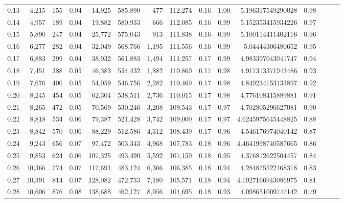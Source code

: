 \begin{tabular}{rrrrrrrrrrrrrrr}
0.13 &   4,215 &    155 &  0.04 &   14,925 &  585,890 &      477 &  112,274 &  0.16 &  1.00 &      5.196317549290028 &      0.98 \\
0.14 &   4,957 &    189 &  0.04 &   19,882 &  580,933 &      666 &  112,085 &  0.16 &  0.99 &      5.152353415934226 &      0.97 \\
0.15 &   5,890 &    247 &  0.04 &   25,772 &  575,043 &      913 &  111,838 &  0.16 &  0.99 &      5.100114411402116 &      0.96 \\
0.16 &   6,277 &    282 &  0.04 &   32,049 &  568,766 &    1,195 &  111,556 &  0.16 &  0.99 &       5.04444306480652 &      0.95 \\
0.17 &   6,883 &    299 &  0.04 &   38,932 &  561,883 &    1,494 &  111,257 &  0.17 &  0.99 &      4.983397043041747 &      0.94 \\
0.18 &   7,451 &    388 &  0.05 &   46,383 &  554,432 &    1,882 &  110,869 &  0.17 &  0.98 &      4.917313371943486 &      0.93 \\
0.19 &   7,676 &    400 &  0.05 &   54,059 &  546,756 &    2,282 &  110,469 &  0.17 &  0.98 &      4.849234153133897 &      0.92 \\
0.20 &   8,245 &    454 &  0.05 &   62,304 &  538,511 &    2,736 &  110,015 &  0.17 &  0.98 &      4.776108415889881 &      0.91 \\
0.21 &   8,265 &    472 &  0.05 &   70,569 &  530,246 &    3,208 &  109,543 &  0.17 &  0.97 &      4.702805296627081 &      0.90 \\
0.22 &   8,818 &    534 &  0.06 &   79,387 &  521,428 &    3,742 &  109,009 &  0.17 &  0.97 &     4.6245975645448825 &      0.88 \\
0.23 &   8,842 &    570 &  0.06 &   88,229 &  512,586 &    4,312 &  108,439 &  0.17 &  0.96 &      4.546176974040142 &      0.87 \\
0.24 &   9,243 &    656 &  0.07 &   97,472 &  503,343 &    4,968 &  107,783 &  0.18 &  0.96 &     4.4641998740587665 &      0.86 \\
0.25 &   9,853 &    624 &  0.06 &  107,325 &  493,490 &    5,592 &  107,159 &  0.18 &  0.95 &      4.376812622504457 &      0.84 \\
0.26 &  10,366 &    774 &  0.07 &  117,691 &  483,124 &    6,366 &  106,385 &  0.18 &  0.94 &      4.284875522168318 &      0.83 \\
0.27 &  10,391 &    814 &  0.07 &  128,082 &  472,733 &    7,180 &  105,571 &  0.18 &  0.94 &     4.1927166943086975 &      0.81 \\
0.28 &  10,606 &    876 &  0.08 &  138,688 &  462,127 &    8,056 &  104,695 &  0.18 &  0.93 &      4.098651009747142 &      0.79 \\

\end{tabular}
